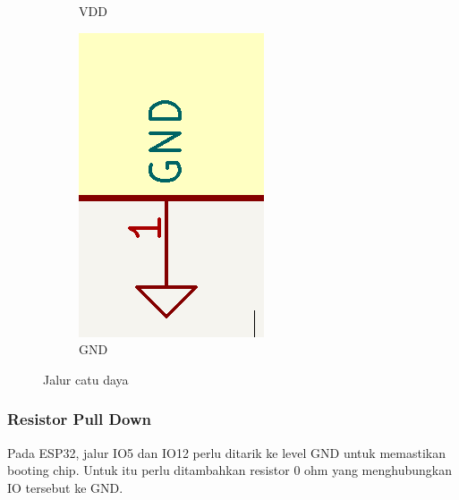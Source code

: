 \documentclass[12pt]{book}
\begin{document}
\begin{figure}[!ht]
\begin{subfigure}[t]{0.1\textwidth}
			\caption{VDD}
		\end{subfigure}
		\begin{subfigure}[t]{0.1\textwidth}
			\includegraphics[width=\textwidth]{images/sch/sch_gnd}
			\caption{GND}
		\end{subfigure}
		\caption{Jalur catu daya}
	\end{figure}

	\subsubsection{Resistor Pull Down}

	Pada ESP32, jalur IO5 dan IO12 perlu ditarik ke level GND untuk memastikan booting chip.
	Untuk itu perlu ditambahkan resistor 0 ohm yang menghubungkan IO tersebut ke GND.
\end{document}
